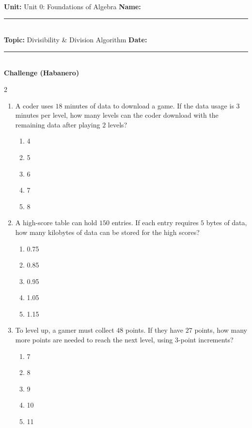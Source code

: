\documentclass[10pt]{article}
\begin{document}
\enlargethispage{2.5cm}

\begin{tcolorbox}[colback=mainblue!5, colframe=mainblue, sharp corners, boxrule=0.5pt]
    \small \textbf{Unit:} Unit 0: Foundations of Algebra \hfill \textbf{Name:} \rule{3cm}{0.4pt} \\
    \small \textbf{Topic:} Divisibility & Division Algorithm \hfill \textbf{Date:} \rule{2cm}{0.4pt} \\
    \centering \textbf{\large Challenge (Habanero)}
\end{tcolorbox}

\vspace{0.2cm}

\begin{multicols}{2}
\begin{enumerate}[label=\textbf{Q\arabic*.}, leftmargin=*, itemsep=6pt, parsep=0pt]

  \item \small A coder uses $18$ minutes of data to download a game. If the data usage is $3$ minutes per level, how many levels can the coder download with the remaining data after playing $2$ levels?
  \begin{enumerate}[label=(\Alph*), leftmargin=0.6cm, nosep, itemsep=2pt]
    \item 4
    \item 5
    \item 6
    \item 7
    \item 8
  \end{enumerate}

  \item \small A high-score table can hold $150$ entries. If each entry requires $5$ bytes of data, how many kilobytes of data can be stored for the high scores?
  \begin{enumerate}[label=(\Alph*), leftmargin=0.6cm, nosep, itemsep=2pt]
    \item 0.75
    \item 0.85
    \item 0.95
    \item 1.05
    \item 1.15
  \end{enumerate}

  \item \small To level up, a gamer must collect $48$ points. If they have $27$ points, how many more points are needed to reach the next level, using $3$-point increments?
  \begin{enumerate}[label=(\Alph*), leftmargin=0.6cm, nosep, itemsep=2pt]
    \item 7
    \item 8
    \item 9
    \item 10
    \item 11
  \end{enumerate}


\end{enumerate}
\end{multicols}
\end{document}
